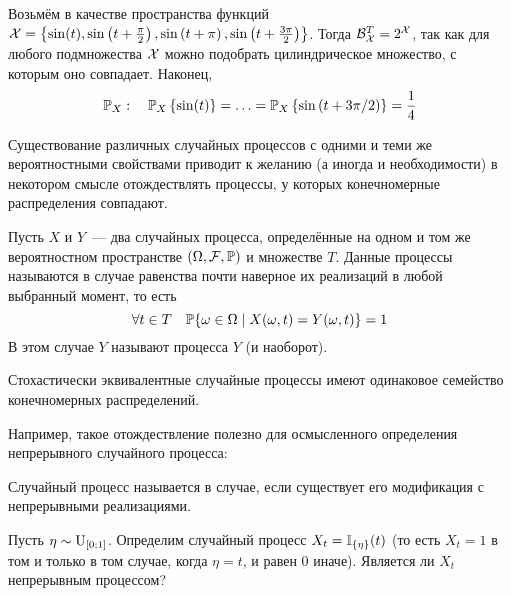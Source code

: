 \begin{solution}
    Возьмём в качестве пространства функций $ \mathcal{X} = \left\{ \sin(t), \sin\left( t + \frac{\pi}{2} \right), \sin\left( t + \pi \right), \sin\left( t + \frac{3 \pi}{2} \right) \right\} $.
    Тогда $ \mathcal{B}_{\mathcal{X}}^T = 2^{\mathcal{X}} $,
    так как для любого подмножества $ \mathcal{X} $ можно подобрать цилиндрическое множество, с которым оно совпадает.
    Наконец,
    \[
        \mathbb{P}_X: \quad \mathbb{P}_X \left\{ \sin(t) \right\} = \ldots = \mathbb{P}_X \left\{ \sin\left( t + 3 \pi/2 \right) \right\} = \frac{1}{4}
    \]
\end{solution}


Существование различных случайных процессов с одними и теми же
вероятностными свойствами приводит к желанию (а иногда и необходимости)
в некотором смысле отождествлять процессы,
у которых конечномерные распределения совпадают.

\begin{definition}
    \label{definition:basics:modification}
    Пусть $ X $ и $ Y $~--- два случайных процесса,
    определённые на одном и том же вероятностном пространстве $ (\Omega, \mathcal{F}, \mathbb{P}) $ и множестве $ T $.
    Данные процессы называются  в случае равенства почти наверное их реализаций в любой выбранный момент,
    то есть
    \[
        \forall t \in T \quad \mathbb{P} \{ \omega \in \Omega \mid X(\omega, t) = Y(\omega, t) \} = 1
    \]
    В этом случае $ Y $ называют  процесса $ Y $ (и наоборот).
\end{definition}

\begin{statement}
    \label{statement:basics:finite_distributions_of_modifications}
    Стохастически эквивалентные случайные процессы имеют одинаковое семейство конечномерных распределений.
\end{statement}

Например, такое отождествление полезно для осмысленного определения непрерывного случайного процесса:
\begin{definition}
    \label{definition:basics:continious_stochastic_process}
    Случайный процесс называется  в случае,
    если существует его модификация с непрерывными реализациями.
\end{definition}

\begin{exercise}
    \label{exercise:basics:continious_stochastic_process}
    Пусть $ \eta \sim \textnormal{U}_{[0;1]} $.
    Определим случайный процесс $ X_t = \mathbb{I}_{\{\eta\}}(t) $
    (то есть $ X_t = 1 $ в том и только в том случае, когда $ \eta = t $, и равен $ 0 $ иначе).
    Является ли $ X_t $ непрерывным процессом?
\end{exercise}

